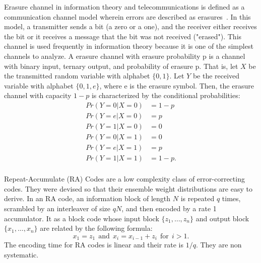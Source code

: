 \noindent Erasure channel in information theory and telecommunications is defined as a communication channel model wherein errors are described as erasures~\cite{erasure}. In this model, a transmitter sends a bit (a zero or a one), and the receiver either receives the bit or it receives a message that the bit was not received ("erased"). This channel is used frequently in information theory because it is one of the simplest channels to analyze. A erasure channel with erasure probability p is a channel with binary input, ternary output, and probability of erasure p. That is, let $X$ be the transmitted random variable with alphabet $\{0, 1\}$. Let $Y$ be the received variable with alphabet $\{0, 1, e\}$, where e is the erasure symbol. Then, the erasure channel with capacity $1 - p$ is characterized by the conditional probabilities:
\vspace{-.2cm}
\begin{equation}
\begin{matrix}
Pr(Y=0|X=0)&=1-p\\
Pr(Y=e|X=0)&=p\\
Pr(Y=1|X=0)&=0\\
Pr(Y=0|X=1)&=0\\
Pr(Y=e|X=1)&=p\\
Pr(Y=1|X=1)&=1-p.\\ 
\end{matrix}\nonumber
\end{equation}

\noindent Repeat-Accumulate (RA) Codes  \cite{racode} are a low complexity class of error-correcting codes. They were devised so that their ensemble weight distributions are easy to derive. In an RA code, an information block of length $N$ is repeated $q$ times, scrambled by an interleaver of size $qN$, and then encoded by a rate 1 accumulator. It as a block code whose input block $\{z_1, \ldots , z_n\}$ and output block $\{x_1, \ldots , x_n\}$ are related by the following formula:
\begin{equation}
x_1 = z_1 \ \  \text{and} \ \ x_i = x_{i-1}+z_i\ \  \text{for} \ \ i > 1. \nonumber \nonumber
\end{equation}
The encoding time for RA codes is linear and their rate is $1/q$. They are non systematic.
~\\


